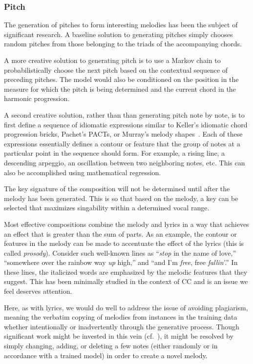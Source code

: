 \documentclass[11pt,phd]{byuprop}
\begin{document}
\subsubsection{Pitch}

The generation of pitches to form interesting melodies has been the subject of significant research. A baseline solution to generating pitches simply chooses random pitches from those belonging to the triads of the accompanying chords. 

A more creative solution to generating pitch is to use a Markov chain to probabilistically choose the next pitch based on the contextual sequence of preceding pitches. The model would also be conditioned on the position in the measure for which the pitch is being determined and the current chord in the harmonic progression.

A second creative solution, rather than than generating pitch note by note, is to first define a sequence of idiomatic expressions similar to Keller's idiomatic chord progression bricks, Pachet's PACTs, or Murray's melody shapes~\cite {keller2013automating,pachet1991representing,murray2012algorithmically}. Each of these expressions essentially defines a contour or feature that the group of notes at a particular point in the sequence should form. For example, a rising line, a descending arpeggio, an oscillation between two neighboring notes, etc. This can also be accomplished using mathematical regression. 

The key signature of the composition will not be determined until after the melody has been generated. This is so that based on the melody, a key can be selected that maximizes singability within a determined vocal range.

Most effective compositions combine the melody and lyrics in a way that achieves an effect that is greater than the sum of parts. As an example, the contour or features in the melody can be made to accentuate the effect of the lyrics (this is called \emph{prosody}). Consider such well-known lines as ``\emph{stop} in the name of love,'' ``somewhere over the rainbow way \emph{up} high,'' and ``and I'm \emph{free}, free \emph{fallin'}.'' In these lines, the italicized words are emphasized by the melodic features that they suggest. This has been minimally studied in the context of CC and is an issue we feel deserves attention.

Here, as with lyrics, we would do well to address the issue of avoiding plagiarism, meaning the verbatim copying of melodies from instances in the training data whether intentionally or inadvertently through the generative process. Though significant work might be invested in this vein (cf.~\cite{papadopoulos1999ai}), it might be resolved by simply changing, adding, or deleting a few notes (either randomly or in accordance with a trained model) in order to create a novel melody.
\end{document}
